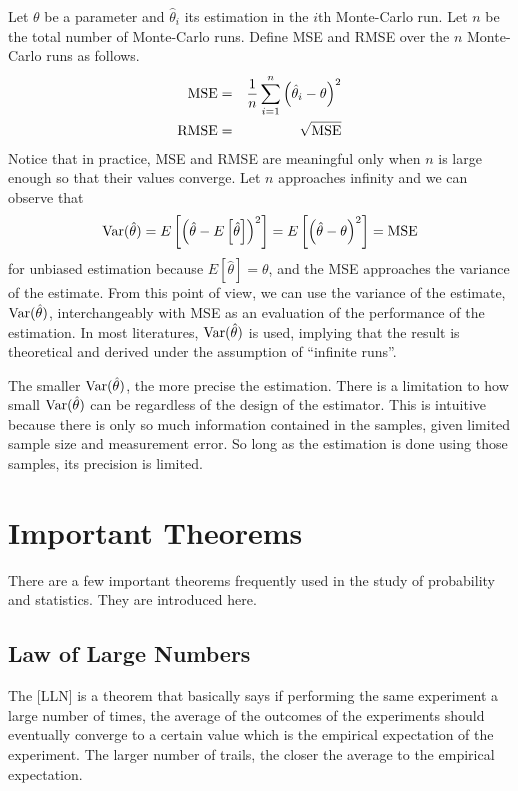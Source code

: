 Let $\theta$ be a parameter and $\hat{\theta}_i$ its estimation in the $i$th Monte-Carlo run. Let $n$ be the total number of Monte-Carlo runs. Define MSE and RMSE over the $n$ Monte-Carlo runs as follows.
\begin{eqnarray}
	\textup{MSE} &=& \dfrac{1}{n}\sum_{i=1}^{n}\left(\hat{\theta}_i-\theta\right)^2 \nonumber \\
	\textup{RMSE} &=& \sqrt{\textup{MSE}} \nonumber
\end{eqnarray}
Notice that in practice, MSE and RMSE are meaningful only when $n$ is large enough so that their values converge. Let $n$ approaches infinity and we can observe that
\begin{eqnarray}
	\textup{Var}(\hat{\theta}) = E\left[\left(\hat{\theta}-E\left[\hat{\theta}\right]\right)^2\right] = E\left[\left(\hat{\theta}-\theta\right)^2\right] = \textup{MSE} \nonumber
\end{eqnarray}
for unbiased estimation because $E\left[\hat{\theta}\right]=\theta$, and the MSE approaches the variance of the estimate. From this point of view, we can use the variance of the estimate, $\textup{Var}(\hat{\theta})$, interchangeably with MSE as an evaluation of the performance of the estimation. In most literatures, $\textup{Var}(\hat{\theta})$ is used, implying that the result is theoretical and derived under the assumption of ``infinite runs''.

The smaller $\textup{Var}(\hat{\theta})$, the more precise the estimation. There is a limitation to how small $\textup{Var}(\hat{\theta})$ can be regardless of the design of the estimator. This is intuitive because there is only so much information contained in the samples, given limited sample size and measurement error. So long as the estimation is done using those samples, its precision is limited. 

\section{Important Theorems}

There are a few important theorems frequently used in the study of probability and statistics. They are introduced here.

\subsection{Law of Large Numbers} \label{subsec:largenumbers}

The [LLN] is a theorem that basically says if performing the same experiment a large number of times, the average of the outcomes of the experiments should eventually converge to a certain value which is the empirical expectation of the experiment. The larger number of trails, the closer the average to the empirical expectation.

